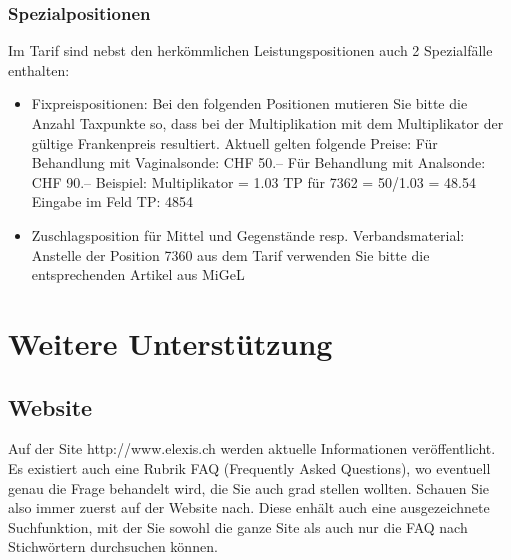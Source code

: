 \documentclass[a4paper]{scrartcl}
\begin{document}
\subsubsection{Spezialpositionen}
Im Tarif sind nebst den herkömmlichen Leistungspositionen auch 2 Spezialfälle enthalten:
\begin{flushleft}
\begin{itemize}
\item 
Fixpreispositionen:\linebreak
Bei den folgenden Positionen mutieren Sie bitte die Anzahl Taxpunkte so, dass bei der Multiplikation mit dem Multiplikator der gültige Frankenpreis resultiert. Aktuell gelten folgende Preise: Für Behandlung mit Vaginalsonde: CHF 50.-- Für Behandlung mit Analsonde: CHF 90.--\linebreak
Beispiel:\linebreak
Multiplikator = 1.03\linebreak
TP für 7362 = 50/1.03 = 48.54\linebreak
Eingabe im Feld TP: 4854
\item Zuschlagsposition für Mittel und Gegenstände resp. Verbandsmaterial:\linebreak
Anstelle der Position 7360 aus dem Tarif verwenden Sie bitte die entsprechenden Artikel aus MiGeL
\end{itemize}
\end{flushleft}

\section{Weitere Unterstützung}
\subsection{Website}
Auf der Site http://www.elexis.ch werden aktuelle Informationen veröffentlicht. Es existiert auch eine Rubrik FAQ (Frequently Asked Questions), wo eventuell genau die Frage behandelt wird, die Sie auch grad stellen wollten. Schauen Sie also immer zuerst auf der Website nach. Diese enhält auch eine ausgezeichnete Suchfunktion, mit der Sie sowohl die ganze Site als auch nur die FAQ nach Stichwörtern durchsuchen können.
\end{document}
